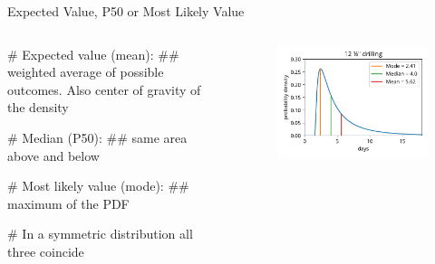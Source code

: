 \documentclass[12pt, aspectratio=149]{beamer}
\theoremstyle{plain}
\begin{document}
\begin{frame}[fragile]{Expected Value, P50 or Most Likely Value}
	\begin{columns}
		\begin{column}{0.5\textwidth}
			\begin{easylist}[itemize]
			# Expected value (mean): 
			## weighted average of possible outcomes. Also
			center of gravity of the density

			# Median (P50): 
			## same area above and below
	
			# Most likely value (mode): 
			## maximum of the PDF

			# In a symmetric distribution all three coincide
			\end{easylist}
		\end{column}
		\begin{column}{0.5\textwidth}
			\begin{figure}
				\includegraphics[width=0.99\linewidth]{figures/lognorm_pdf}
			\end{figure}
		\end{column}
	\end{columns}
	\end{frame}
	
\end{document}
